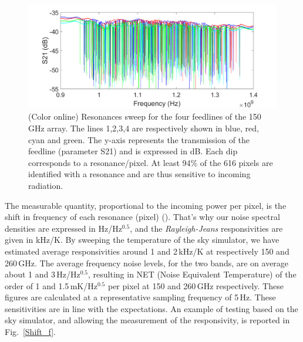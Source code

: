 \documentclass[]{aa} %
\begin{document}
\begin{figure}[h]
\begin{center}
   \centering
    \includegraphics[width=1.0\linewidth]{VNA_scans_150GHz.png}
    \caption{(Color online) Resonances sweep for the four feedlines of the 150\,GHz array. The lines 1,2,3,4 are respectively shown in blue, red, cyan and green. The y-axis represents the transmission of the feedline (parameter S21) and is expressed in dB. Each dip corresponds to a resonance/pixel. At least 94\% of the 616 pixels are identified with a resonance and are thus sensitive to incoming radiation.}
         \label{VNA}
\end{center}
\end{figure}

The measurable quantity, proportional to the incoming power per pixel, is the shift in frequency of each resonance (pixel) (\cite{Swenson2010}). That's why our noise spectral densities are expressed in Hz/Hz$^{0.5}$, and the \textit{Rayleigh-Jeans} responsivities are given in kHz/K. By sweeping the temperature of the sky simulator, we have estimated average responsivities around 1 and 2\,kHz/K at respectively 150 and 260\,GHz. The average frequency noise levels, for the two bands, are on average about 1 and 3\,Hz/Hz$^{0.5}$, resulting in NET (Noise Equivalent Temperature) of the order of 1 and 1.5\,mK/Hz$^{0.5}$ per pixel at 150 and 260\,GHz respectively. These figures are calculated at a representative sampling frequency of 5\,Hz. 
These sensitivities are in line with the expectations. An example of testing based on the sky simulator, and allowing the measurement of the responsivity, is reported in Fig.~\ref{Shift_f}. 
\end{document}
